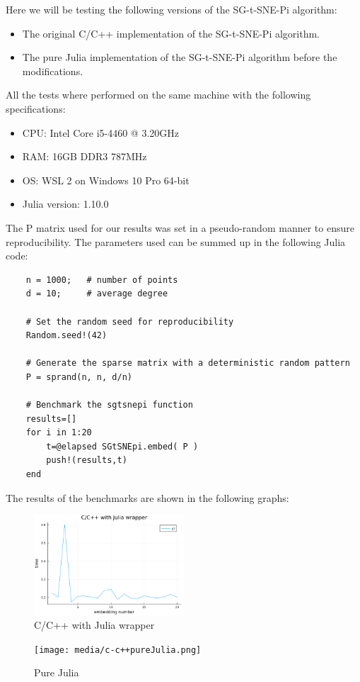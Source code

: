 Here we will be testing the following versions of the SG-t-SNE-Pi algorithm:
\begin{itemize}
    \item The original C/C++ implementation of the SG-t-SNE-Pi algorithm.
    \item The pure Julia implementation of the SG-t-SNE-Pi algorithm before the modifications.
\end{itemize}
All the tests where performed on the same machine with the following specifications:
\begin{itemize}
    \item CPU: Intel Core i5-4460 @ 3.20GHz
    \item RAM: 16GB DDR3 787MHz
    \item OS: WSL 2 on Windows 10 Pro 64-bit
    \item Julia version: 1.10.0
\end{itemize}
The P matrix used for our results was set in a pseudo-random manner to ensure reproducibility. The parameters
used can be summed up in the following Julia code:
\begin{verbatim} 
    n = 1000;   # number of points
    d = 10;     # average degree
    
    # Set the random seed for reproducibility
    Random.seed!(42)
    
    # Generate the sparse matrix with a deterministic random pattern
    P = sprand(n, n, d/n)

    # Benchmark the sgtsnepi function
    results=[]
    for i in 1:20
        t=@elapsed SGtSNEpi.embed( P )
        push!(results,t)
    end
\end{verbatim}
The results of the benchmarks are shown in the following graphs:
\begin{figure}[H]
    \includegraphics[width=0.5\textwidth]{media/c-c++plot.png}
    \caption{C/C++ with Julia wrapper}
\end{figure}
\begin{figure}[H]
    \texttt{[image: media/c-c++pureJulia.png]}
    \caption{Pure Julia}
\end{figure}